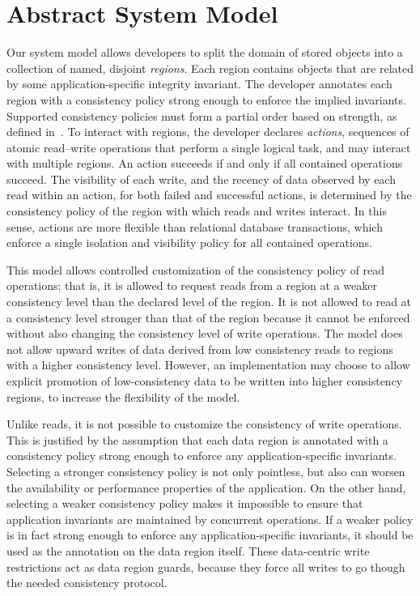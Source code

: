 \documentclass[numbers]{sigplanconf}
\begin{document}
\section{Abstract System Model}
\label{sec:model}
Our system model allows developers to split the domain of stored objects into a
collection of named, disjoint \emph{regions}. Each
region contains objects that are related by some application-specific integrity
invariant. The developer annotates each region with a consistency policy 
strong enough to enforce the implied invariants. Supported consistency policies 
must form a partial order based on strength, as defined
in~\cite{sivaramakrishnan2015declarative}. To interact with regions, the developer
declares \emph{actions}, sequences of atomic
read--write operations that perform a single logical task, and may interact with
multiple regions. An action succeeds if and only if all contained operations
succeed. The visibility of each write, and the recency of
data observed by each read within an action, for both failed and successful
actions, is determined by the consistency policy of the region with which reads
and writes interact. In this sense, actions are more flexible than relational
database transactions, which enforce a single isolation and visibility policy for all contained
operations.

This model allows controlled customization of the consistency policy of read operations; 
that is, it is allowed to request reads from a region at a weaker consistency level than the declared level of
the region. It is not allowed to read
at a consistency level stronger than that of the region
because it cannot be enforced without also changing the consistency
level of write operations. The model does not allow upward writes of data
derived from low consistency reads to regions with a higher consistency level.
However, an implementation may choose to
allow explicit promotion of low-consistency data to be written into higher
consistency regions, to increase the flexibility of the model.

Unlike reads, it is not possible to customize the consistency of write
operations. This is justified
by the assumption that each data region is annotated with a consistency policy strong enough to enforce 
any application-specific invariants. Selecting a stronger
consistency policy is not only pointless, but also can worsen
the availability or performance properties of the application. On the other hand,
selecting a weaker consistency policy makes it impossible to ensure that
application invariants are maintained by concurrent
operations. If a weaker policy is in fact strong enough to enforce any
application-specific
invariants, it should be used as the annotation on the data region itself. 
These data-centric write restrictions act as data region guards, because they 
force all writes to go though the needed consistency protocol.
\end{document}
